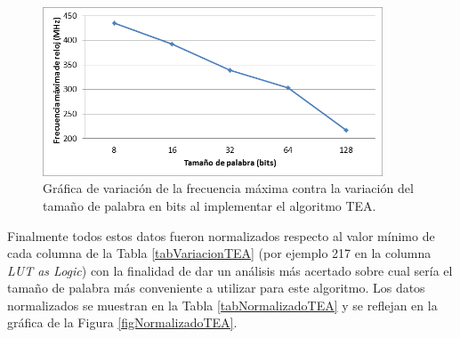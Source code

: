 \begin{figure}[H]
	\centering
	\includegraphics[width=0.9\textwidth]{./images/figFrecuenciasTEA}
	\caption{Gráfica de variación de la frecuencia máxima contra la variación del tamaño de palabra en bits al implementar el algoritmo TEA.}
	\label{figFrecuenciasTEA}
\end{figure}	
	
Finalmente todos estos datos fueron normalizados respecto al valor mínimo de cada columna de la Tabla \ref{tabVariacionTEA} (por ejemplo 217 en la columna \textit{LUT as Logic}) con la finalidad de dar un análisis más acertado sobre cual sería el tamaño de palabra más conveniente a utilizar para este algoritmo. Los datos normalizados se muestran en la Tabla \ref{tabNormalizadoTEA} y se reflejan en la gráfica de la Figura \ref{figNormalizadoTEA}.

